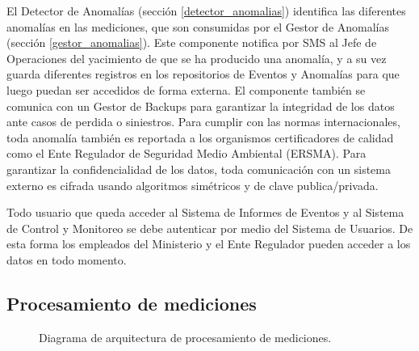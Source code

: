\documentclass{article}
\theoremstyle{definition}
\theoremstyle{remark}
\begin{document}
El Detector de Anomalías (sección \ref{detector_anomalias}) identifica las diferentes anomalías en las mediciones, que son consumidas por el Gestor de Anomalías (sección \ref{gestor_anomalias}). Este componente notifica por SMS al Jefe de Operaciones del yacimiento de que se ha producido una anomalía, y a su vez guarda diferentes registros en los repositorios de Eventos y Anomalías para que luego puedan ser accedidos de forma externa. El componente también se comunica con un Gestor de Backups para garantizar la integridad de los datos ante casos de perdida o siniestros. Para cumplir con las normas internacionales, toda anomalía también es reportada a los organismos certificadores de calidad como el Ente Regulador de Seguridad Medio Ambiental (ERSMA). Para garantizar la confidencialidad de los datos, toda comunicación con un sistema externo es cifrada usando algoritmos simétricos y de clave publica/privada.

Todo usuario que queda acceder al Sistema de Informes de Eventos y al Sistema de Control y Monitoreo se debe autenticar por medio del Sistema de Usuarios. De esta forma los empleados del Ministerio y el Ente Regulador pueden acceder a los datos en todo momento.

\subsection{Procesamiento de mediciones}  \label{procesador_mediciones}

\begin{figure}[H]
	\caption{Diagrama de arquitectura de procesamiento de mediciones.}
\end{figure}
\end{document}
